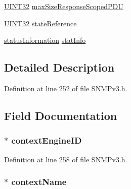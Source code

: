 \begin{DoxyCompactItemize}
\item 
\hyperlink{_generic_type_defs_8h_a1720f33f59b583f0c2ed071815623a86}{U\+I\+N\+T32} \hyperlink{structdispathcer_return_response_pdu_a4d30d65bba90a70a4606761f5ff3d17d}{max\+Size\+Response\+Scoped\+P\+D\+U}
\item 
\hyperlink{_generic_type_defs_8h_a1720f33f59b583f0c2ed071815623a86}{U\+I\+N\+T32} \hyperlink{structdispathcer_return_response_pdu_a62eef1407cf307242b77d068071cafeb}{state\+Reference}
\item 
\hyperlink{_s_n_m_pv3_8h_a074d8e7ed4175677b89b7c8d5d45e294}{status\+Information} \hyperlink{structdispathcer_return_response_pdu_ad07540e94950d793173ffdb63915b853}{stat\+Info}
\end{DoxyCompactItemize}


\subsection{Detailed Description}


Definition at line 252 of file S\+N\+M\+Pv3.\+h.



\subsection{Field Documentation}
\hypertarget{structdispathcer_return_response_pdu_aa75baf2d001f5d5ac415eed279fd6e85}{}
\subsubsection[{context\+Engine\+I\+D}]{$\ast$ context\+Engine\+I\+D}\label{structdispathcer_return_response_pdu_aa75baf2d001f5d5ac415eed279fd6e85}


Definition at line 258 of file S\+N\+M\+Pv3.\+h.

\hypertarget{structdispathcer_return_response_pdu_af55ce5882ccbc8435fb33f1020c74550}{}
\subsubsection[{context\+Name}]{$\ast$ context\+Name}\label{structdispathcer_return_response_pdu_af55ce5882ccbc8435fb33f1020c74550}


